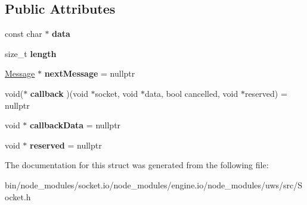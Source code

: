 \subsection*{Public Attributes}
\begin{DoxyCompactItemize}
\item 
\mbox{\label{structu_s_1_1_socket_1_1_queue_1_1_message_ab8dc3d46b7c06a9635073a49c33c73b6}} 
const char $\ast$ {\bfseries data}
\item 
\mbox{\label{structu_s_1_1_socket_1_1_queue_1_1_message_a45854495707f03110dc310f6f125f0ea}} 
size\+\_\+t {\bfseries length}
\item 
\mbox{\label{structu_s_1_1_socket_1_1_queue_1_1_message_adabb8bd785037a59a91f78b0ad387273}} 
\mbox{\hyperlink{structu_s_1_1_socket_1_1_queue_1_1_message}{Message}} $\ast$ {\bfseries next\+Message} = nullptr
\item 
\mbox{\label{structu_s_1_1_socket_1_1_queue_1_1_message_ae81d8fbd6fd7f87ff601006d30e977ef}} 
void($\ast$ {\bfseries callback} )(void $\ast$socket, void $\ast$data, bool cancelled, void $\ast$reserved) = nullptr
\item 
\mbox{\label{structu_s_1_1_socket_1_1_queue_1_1_message_a537dbb8c4724309e1d8917286aa983d1}} 
void $\ast$ {\bfseries callback\+Data} = nullptr
\item 
\mbox{\label{structu_s_1_1_socket_1_1_queue_1_1_message_a0588478aa3eb1f5f507df549baf9424d}} 
void $\ast$ {\bfseries reserved} = nullptr
\end{DoxyCompactItemize}


The documentation for this struct was generated from the following file\+:\begin{DoxyCompactItemize}
\item 
bin/node\+\_\+modules/socket.\+io/node\+\_\+modules/engine.\+io/node\+\_\+modules/uws/src/Socket.\+h\end{DoxyCompactItemize}
